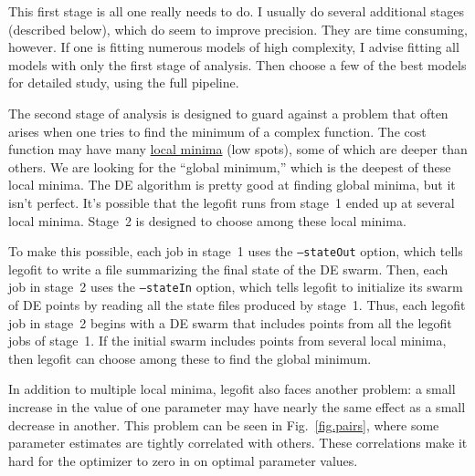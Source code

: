 \documentclass[11pt]{article}
\begin{document}
This first stage is all one really needs to do. I usually do several
additional stages (described below), which do seem to improve
precision. They are time consuming, however. If one is fitting
numerous models of high complexity, I advise fitting all models with
only the first stage of analysis. Then choose a few of the best models
for detailed study, using the full pipeline.

The second stage of analysis is designed to guard against a problem
that often arises when one tries to find the minimum of a complex
function. The cost function may have many
\href{https://en.wikipedia.org/wiki/Maxima_and_minima}{local minima}
(low spots), some of which are deeper than others. We are looking for
the ``global minimum,'' which is the deepest of these local
minima. The DE algorithm is pretty good at finding global minima, but
it isn't perfect. It's possible that the legofit runs from stage~1
ended up at several local minima. Stage~2 is designed to choose among
these local minima.

To make this possible, each job in stage~1 uses the
\texttt{--stateOut} option, which tells legofit to write a file
summarizing the final state of the DE swarm. Then, each job in
stage~2 uses the \texttt{--stateIn} option, which tells legofit to
initialize its swarm of DE points by reading all the state files
produced by stage~1. Thus, each legofit job in stage~2 begins with a
DE swarm that includes points from all the legofit jobs of stage~1. If
the initial swarm includes points from several local minima, then
legofit can choose among these to find the global minimum.

In addition to multiple local minima, legofit also faces another
problem: a small increase in the value of one parameter may have
nearly the same effect as a small decrease in another. This problem
can be seen in Fig.~\ref{fig.pairs}, where some parameter estimates
are tightly correlated with others. These correlations make it hard
for the optimizer to zero in on optimal parameter values.
\end{document}
